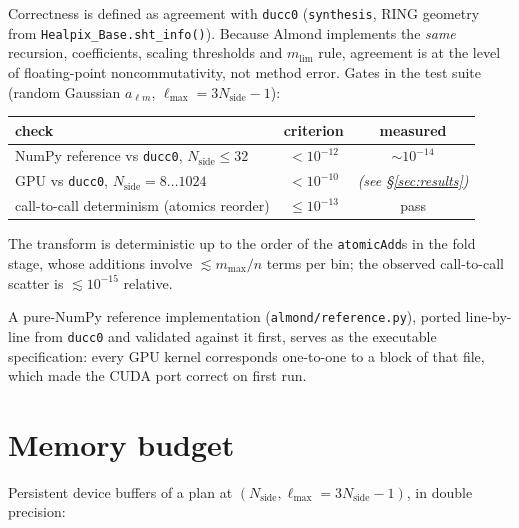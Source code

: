 \documentclass[11pt]{article}
\begin{document}
Correctness is defined as agreement with \texttt{ducc0}
(\texttt{synthesis}, RING geometry from \texttt{Healpix\_Base.sht\_info()}).
Because Almond implements the \emph{same} recursion, coefficients, scaling
thresholds and $m_\mathrm{lim}$ rule, agreement is at the level of
floating-point noncommutativity, not method error.  Gates in the test
suite (random Gaussian $a_{\ell m}$, $\ell_{\max}=3N_\mathrm{side}-1$):
\begin{center}
\begin{tabular}{lcc}
\toprule
check & criterion & measured \\
\midrule
NumPy reference vs \texttt{ducc0}, $N_\mathrm{side}\!\le\!32$ &
  $<10^{-12}$ & $\sim10^{-14}$ \\
GPU vs \texttt{ducc0}, $N_\mathrm{side} = 8\ldots1024$ &
  $<10^{-10}$ & \textit{(see \S\ref{sec:results})} \\
call-to-call determinism (atomics reorder) & $\le10^{-13}$ & pass \\
\bottomrule
\end{tabular}
\end{center}
The transform is deterministic up to the order of the \texttt{atomicAdd}s
in the fold stage, whose additions involve $\lesssim m_{\max}/n$ terms per
bin; the observed call-to-call scatter is $\lesssim10^{-15}$ relative.

A pure-NumPy reference implementation (\texttt{almond/reference.py}), ported
line-by-line from \texttt{ducc0} and validated against it first, serves as
the executable specification: every GPU kernel corresponds one-to-one to a
block of that file, which made the CUDA port correct on first run.

\section{Memory budget}
\label{sec:memory}

Persistent device buffers of a plan at $(N_\mathrm{side}, \ell_{\max} =
3N_\mathrm{side}-1)$, in double precision:
\end{document}
